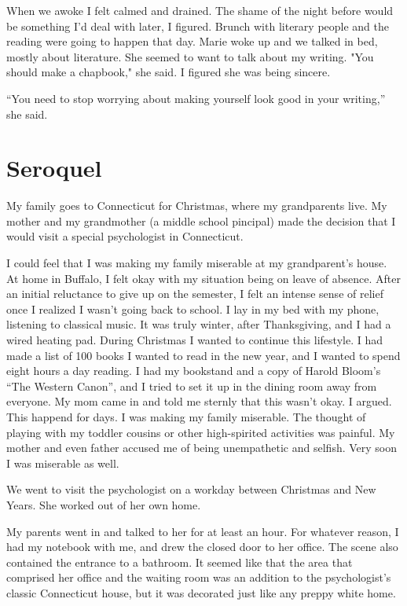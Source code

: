 \documentclass[12pt]{article}
\begin{document}
When we awoke I felt calmed and drained.  The shame of the night before would be
something I'd deal with later, I figured.  Brunch with literary people and the
reading were going to happen that day.  Marie woke up and we talked in bed,
mostly about literature.  She seemed to want to talk about my writing.  "You
should make a chapbook," she said.  I figured she was being sincere.  

``You need to stop worrying about making yourself look good in your writing,'' she
said.

\section{Seroquel}
My family goes to Connecticut for Christmas, where my grandparents live.  My
mother and my grandmother (a middle school pincipal) made the decision that I
would visit a special psychologist in Connecticut.

I could feel that I was making my family miserable at my grandparent's house.
At home in Buffalo, I felt okay with my situation being on leave of absence.
After an initial reluctance to give up on the semester, I felt an intense sense
of relief once I realized I wasn't going back to school.  I lay in my bed with my
phone, listening to classical music.  It was truly winter, after Thanksgiving,
and I had a wired heating pad.  During Christmas I wanted to continue this
lifestyle.  I had made a list of 100 books I wanted to read in the new year,
and I wanted to spend eight hours a day reading.  I had my bookstand and a copy
of Harold Bloom's ``The Western Canon'', and I tried to set it up in the dining
room away from everyone.  My mom came in and told me sternly that this wasn't
okay.  I argued.  This happend for days.  I was making my family miserable.  The
thought of playing with my toddler cousins or other high-spirited activities was
painful.  My mother and even father accused me of being unempathetic and
selfish.  Very soon I was miserable as well.

We went to visit the psychologist on a workday between Christmas and New
Years.  She worked out of her own home. 

My parents went in and talked to her for at least an hour.  For whatever reason,
I had my notebook with me, and drew the closed door to her office.  The scene
also contained the entrance to a bathroom.  It seemed like that the area that
comprised her office and the waiting room was an addition to the psychologist's
classic Connecticut house, but it was decorated just like any preppy white home.
\end{document}
